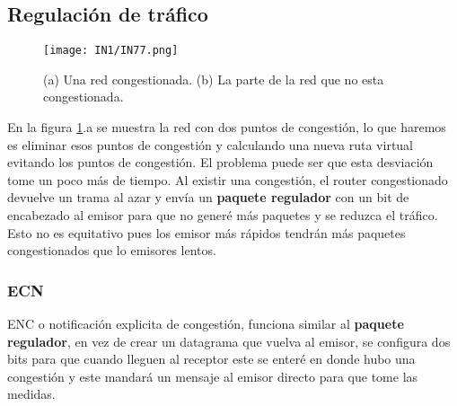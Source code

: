 \documentclass[12pt,fleqn,a4paper,]{LegrandOrangeBook}
\begin{document}
\subsection{Regulación de tráfico}
\begin{figure}[H]
\centering
\texttt{[image: IN1/IN77.png]}
\caption{(a) Una red congestionada. (b) La parte de la red que no esta congestionada.}
\label{fig:regulacion trafico}
\end{figure}
En la figura \ref{fig:regulacion trafico}.a se muestra la red con dos puntos de congestión, lo que haremos es eliminar esos puntos de congestión y calculando una nueva ruta virtual evitando los puntos de congestión. El problema puede ser que esta desviación tome un poco más de tiempo. Al existir una congestión, el router congestionado devuelve un trama al azar y envía un \textbf{paquete regulador} con un bit de encabezado al emisor para que no generé más paquetes y se reduzca el tráfico. Esto no es equitativo pues los emisor más rápidos tendrán más paquetes congestionados que lo emisores lentos.
\subsubsection{ECN}
ENC o notificación explicita de congestión, funciona similar al \textbf{paquete regulador}, en vez de crear un datagrama que vuelva al emisor, se configura dos bits para que cuando lleguen al receptor este se enteré en donde hubo una congestión y este mandará un mensaje al emisor directo para que tome las medidas.


\end{document}

